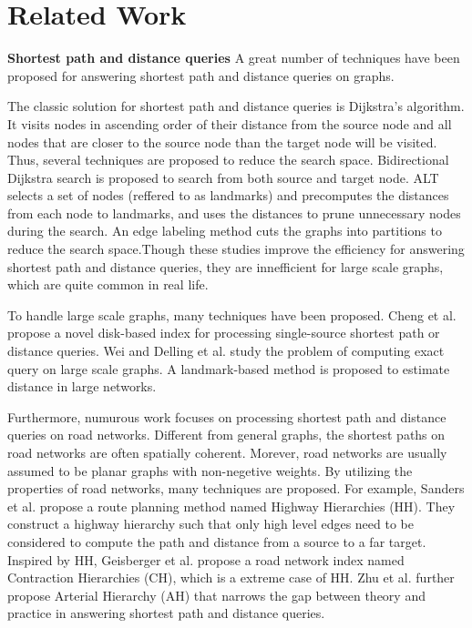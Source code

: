 \section{Related Work}
\label{sec-related}

\smallskip\noindent\textbf{Shortest path and distance queries} A great number of techniques have been proposed for answering shortest path and distance queries on graphs\cite{WuXDCZZ12, Dijkstra59, FredmanT84, LubyR89, GeisbergerSSD08, SankaranarayananSA09, SandersS05, GoldbergH05, ChengKCC12, MozesS12, ChanL07, SaundersT07, WagnerW07, bast2014route, delling2014robust, arz2013transit, PotamiasBCG09, SarmaGNP10, Wei10, ThorupZ05, SankaranarayananS10}.

The classic solution for shortest path and distance queries is Dijkstra's algorithm\cite{Dijkstra59}. It visits nodes in ascending order of their distance from the source node and all nodes that are closer to the source node than the target node will be visited. Thus, several techniques are proposed to reduce the search space\cite{LubyR89, GoldbergH05}. Bidirectional Dijkstra search\cite{LubyR89} is proposed to search from both source and target node. ALT\cite{GoldbergH05} selects a set of nodes (reffered to as landmarks) and precomputes the distances from each node to landmarks, and uses the distances to prune unnecessary nodes during the search. An edge labeling method\cite{MohringSSWW05} cuts the graphs into partitions to reduce the search space.Though these studies improve the efficiency for answering shortest path and distance queries, they are innefficient for large scale graphs, which are quite common in real life.

To handle large scale graphs, many techniques have been proposed\cite{ChengKCC12, delling2014robust, PotamiasBCG09, Wei10}. Cheng et al. \cite{ChengKCC12} propose a novel disk-based index for processing single-source shortest path or distance queries. Wei \cite{Wei10} and Delling et al.\cite{delling2014robust} study the problem of computing exact query on large scale graphs. A landmark-based method\cite{PotamiasBCG09} is proposed to estimate distance in large networks.

Furthermore, numurous work focuses on processing shortest path and distance queries on road networks. Different from general graphs, the shortest paths on road networks are often spatially coherent. Morever, road networks are usually assumed to be planar graphs with non-negetive weights. By utilizing the properties of road networks, many techniques\cite{SandersS05, GeisbergerSSD08, zhu2013shortest} are proposed. For example, Sanders et al. propose a route planning method named Highway Hierarchies (HH)\cite{SandersS05}. They construct a highway hierarchy such that only high level edges need to be considered to compute the path and distance from a source to a far target. Inspired by HH, Geisberger et al.\cite{GeisbergerSSD08} propose a road network index named Contraction Hierarchies (CH), which is a extreme case of HH. Zhu et al. further propose Arterial Hierarchy (AH)\cite{zhu2013shortest} that narrows the gap between theory and practice in answering shortest path and distance queries.

